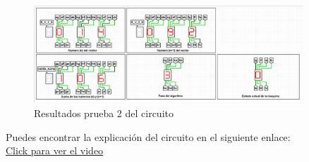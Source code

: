 \documentclass{article}
\begin{document}
\begin{figure}[h] %
    \centering
    \includegraphics[width=0.9\textwidth]{imagenes/resultado_2.png} %
    \caption{Resultados prueba 2 del circuito} %
    \label{fig:resultado2} %
\end{figure}

Puedes encontrar la explicación del circuito en el siguiente enlace: \\
\href{https://youtu.be/miN_wIEpYNM}{Click para ver el video}
\end{document}
